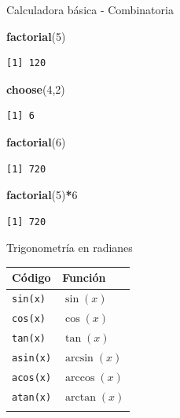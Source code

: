 \documentclass[
  ignorenonframetext,
  aspectratio=169]{beamer}
\newenvironment{Shaded}{\begin{snugshade}}{\end{snugshade}}
\newcommand{\DecValTok}[1]{\textcolor[rgb]{0.00,0.00,0.81}{#1}}
\newcommand{\FunctionTok}[1]{\textcolor[rgb]{0.13,0.29,0.53}{\textbf{#1}}}
\newcommand{\NormalTok}[1]{#1}
\newcommand{\SpecialCharTok}[1]{\textcolor[rgb]{0.81,0.36,0.00}{\textbf{#1}}}
\begin{document}
\begin{frame}[fragile]{Calculadora básica - Combinatoria}
\label{calculadora-buxe1sica---combinatoria}
\begin{Shaded}
\begin{Highlighting}[]
\FunctionTok{factorial}\NormalTok{(}\DecValTok{5}\NormalTok{)}
\end{Highlighting}
\end{Shaded}

\begin{verbatim}
[1] 120
\end{verbatim}

\begin{Shaded}
\begin{Highlighting}[]
\FunctionTok{choose}\NormalTok{(}\DecValTok{4}\NormalTok{,}\DecValTok{2}\NormalTok{)}
\end{Highlighting}
\end{Shaded}

\begin{verbatim}
[1] 6
\end{verbatim}

\begin{Shaded}
\begin{Highlighting}[]
\FunctionTok{factorial}\NormalTok{(}\DecValTok{6}\NormalTok{)}
\end{Highlighting}
\end{Shaded}

\begin{verbatim}
[1] 720
\end{verbatim}

\begin{Shaded}
\begin{Highlighting}[]
\FunctionTok{factorial}\NormalTok{(}\DecValTok{5}\NormalTok{)}\SpecialCharTok{*}\DecValTok{6}
\end{Highlighting}
\end{Shaded}

\begin{verbatim}
[1] 720
\end{verbatim}
\end{frame}

\begin{frame}[fragile]{Trigonometría en radianes}
\label{trigonometruxeda-en-radianes}
\begin{longtable}[]{@{}ll@{}}
\toprule\noalign{}
Código & Función \\
\midrule\noalign{}
\endhead
\texttt{sin(x)} & \(\sin(x)\) \\
\texttt{cos(x)} & \(\cos(x)\) \\
\texttt{tan(x)} & \(\tan(x)\) \\
\texttt{asin(x)} & \(\arcsin(x)\) \\
\texttt{acos(x)} & \(\arccos(x)\) \\
\texttt{atan(x)} & \(\arctan(x)\) \\
\bottomrule\noalign{}
\end{longtable}
\end{frame}
\end{document}
